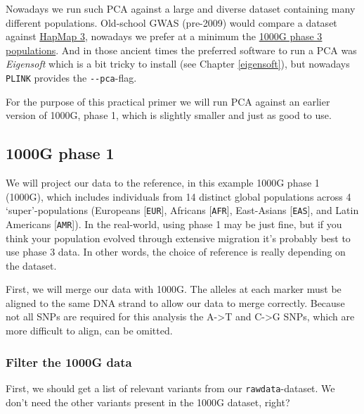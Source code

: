 \documentclass[
]{book}
\newcommand{\passthrough}[1]{#1}
\begin{document}
Nowadays we run such PCA against a large and diverse dataset containing many different populations. Old-school GWAS (pre-2009) would compare a dataset against \href{https://www.broadinstitute.org/medical-and-population-genetics/hapmap-3}{HapMap 3}, nowadays we prefer at a minimum the \href{https://www.internationalgenome.org}{1000G phase 3 populations}. And in those ancient times the preferred software to run a PCA was \emph{Eigensoft} which is a bit tricky to install (see Chapter \ref{eigensoft}), but nowadays \passthrough{\lstinline!PLINK!} provides the \passthrough{\lstinline!--pca!}-flag.

For the purpose of this practical primer we will run PCA against an earlier version of 1000G, phase 1, which is slightly smaller and just as good to use.

\hypertarget{g-phase-1}{%
\subsection{1000G phase 1}\label{g-phase-1}}

We will project our data to the reference, in this example 1000G phase 1 (1000G), which includes individuals from 14 distinct global populations across 4 `super'-populations (Europeans {[}\passthrough{\lstinline!EUR!}{]}, Africans {[}\passthrough{\lstinline!AFR!}{]}, East-Asians {[}\passthrough{\lstinline!EAS!}{]}, and Latin Americans {[}\passthrough{\lstinline!AMR!}{]}). In the real-world, using phase 1 may be just fine, but if you think your population evolved through extensive migration it's probably best to use phase 3 data. In other words, the choice of reference is really depending on the dataset.

First, we will merge our data with 1000G. The alleles at each marker must be aligned to the same DNA strand to allow our data to merge correctly. Because not all SNPs are required for this analysis the A-\textgreater T and C-\textgreater G SNPs, which are more difficult to align, can be omitted.

\hypertarget{filter-the-1000g-data}{%
\subsubsection{Filter the 1000G data}\label{filter-the-1000g-data}}

First, we should get a list of relevant variants from our \passthrough{\lstinline!rawdata!}-dataset. We don't need the other variants present in the 1000G dataset, right?
\end{document}
